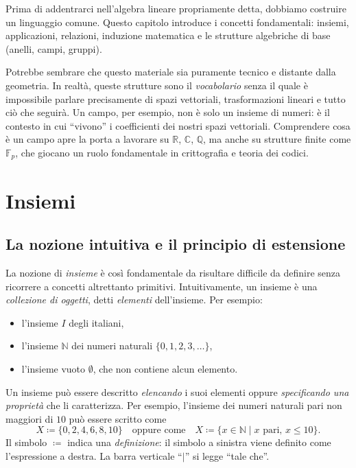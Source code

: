 \documentclass[11pt, a4paper]{book}
\theoremstyle{definition}
\theoremstyle{plain}
\theoremstyle{remark}
\newcommand{\N}{\mathbb{N}}
\newcommand{\Q}{\mathbb{Q}}
\newcommand{\R}{\mathbb{R}}
\newcommand{\C}{\mathbb{C}}
\begin{document}
Prima di addentrarci nell'algebra lineare propriamente detta, dobbiamo costruire un linguaggio comune. Questo capitolo introduce i concetti fondamentali: insiemi, applicazioni, relazioni, induzione matematica e le strutture algebriche di base (anelli, campi, gruppi).

Potrebbe sembrare che questo materiale sia puramente tecnico e distante dalla geometria. In realtà, queste strutture sono il \emph{vocabolario} senza il quale è impossibile parlare precisamente di spazi vettoriali, trasformazioni lineari e tutto ciò che seguirà. Un campo, per esempio, non è solo un insieme di numeri: è il contesto in cui ``vivono'' i coefficienti dei nostri spazi vettoriali. Comprendere cosa è un campo apre la porta a lavorare su $\R$, $\C$, $\Q$, ma anche su strutture finite come $\mathbb{F}_p$, che giocano un ruolo fondamentale in crittografia e teoria dei codici.

\section{Insiemi}

\subsection{La nozione intuitiva e il principio di estensione}

La nozione di \emph{insieme} è così fondamentale da risultare difficile da definire senza ricorrere a concetti altrettanto primitivi. Intuitivamente, un insieme è una \emph{collezione di oggetti}, detti \emph{elementi} dell'insieme. Per esempio:
\begin{itemize}
  \item l'insieme $I$ degli italiani,
  \item l'insieme $\N$ dei numeri naturali $\{0, 1, 2, 3, \ldots\}$,
  \item l'insieme vuoto $\emptyset$, che non contiene alcun elemento.
\end{itemize}

Un insieme può essere descritto \emph{elencando} i suoi elementi oppure \emph{specificando una proprietà} che li caratterizza. Per esempio, l'insieme dei numeri naturali pari non maggiori di $10$ può essere scritto come
\[
  X \coloneqq \{0, 2, 4, 6, 8, 10\}
  \quad\text{oppure come}\quad
  X \coloneqq \{x \in \N \mid x \text{ pari}, \, x \leq 10\}.
\]
Il simbolo $\coloneqq$ indica una \emph{definizione}: il simbolo a sinistra viene definito come l'espressione a destra. La barra verticale ``$\mid$'' si legge ``tale che''.
\end{document}
